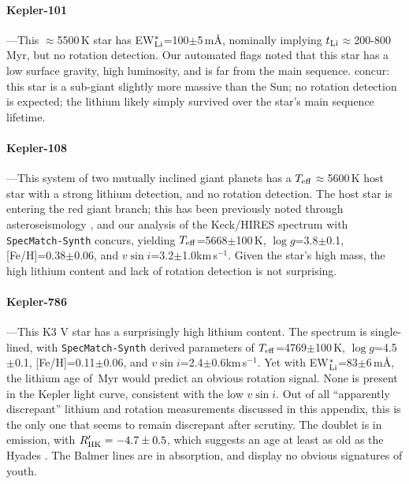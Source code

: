 \documentclass[11pt,twocolumn,tighten]{aastex63}
\newcommand{\kms}{{km\,s$^{-1}$}}
\begin{document}
\paragraph{Kepler-101}---This $\approx$5500\,K star has EW$_{\rm
Li}^{\ast}$=100$\pm$5\,m\AA, nominally implying $t_{\rm
Li}$$\approx$200-800\,Myr, but no rotation detection.  Our automated
flags noted that this star has a low surface gravity, high luminosity,
and is far from the main sequence.  \citet{2014A&A...572A...2B}
concur: this star is a sub-giant slightly more massive than the Sun;
no rotation detection is expected; the lithium likely simply survived
over the star's main sequence lifetime.

\paragraph{Kepler-108}---This system of two mutually inclined giant
planets \citep{2017AJ....153...45M} has a $T_{\rm
eff}$$\approx$5600\,K host star with a strong lithium detection, and
no rotation detection.  The host star is entering the red giant
branch; this has been previously noted through asteroseismology
\citep{2013ApJ...767..127H}, and our analysis of the Keck/HIRES
spectrum with \texttt{SpecMatch-Synth} \citep{2017AJ....154..107P}
concurs, yielding $T_{\rm eff}$=5668$\pm$100\,K, $\log g$=3.8$\pm$0.1,
[Fe/H]=0.38$\pm$0.06, and $v\sin i$=3.2$\pm$1.0\kms.  Given the star's
high mass, the high lithium content and lack of rotation detection is
not surprising.



\paragraph{Kepler-786}---This K3 V star has a surprisingly high
lithium content.  The spectrum is single-lined, with
\texttt{SpecMatch-Synth} derived parameters of $T_{\rm
eff}$=4769$\pm$100\,K, $\log g$=4.5$\pm$0.1, [Fe/H]=0.11$\pm$0.06, and
$v\sin i$=2.4$\pm$0.6\kms.  Yet with EW$_{\rm
Li}^{\ast}$=83$\pm$6\,m\AA, the lithium age of \kepseveneightsix\,Myr
would predict an obvious rotation signal.  None is present in the
Kepler light curve, consistent with the low $v\sin i$.  Out of all
``apparently discrepant'' lithium and rotation measurements discussed
in this appendix, this is the only one that seems to remain discrepant
after scrutiny.  The   doublet is in emission, with
$R'_{\rm HK}=-4.7\pm0.5$, which suggests an age at least as old as the
Hyades \citep{Mamajek_2008}.  The Balmer lines are in absorption, and
display no obvious signatures of youth.
\end{document}
